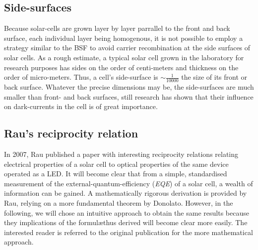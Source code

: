 \subsection{Side-surfaces}
Because solar-cells are grown layer by layer parrallel to the front and back surface, each individual layer being homogenous, it is not possible to employ a strategy similar to the BSF to avoid carrier recombination at the side surfaces of solar cells.
As a rough estimate, a typical \gaas solar cell grown in the laboratory for research purposes has sides on the order of centi-meters and thickness on the order of micro-meters. Thus, a cell's side-surface is $\sim \frac{1}{10000}$ the size of its front or back surface. Whatever the precise dimensions may be, the side-surfaces are much smaller than front- and back surfaces, still research has shown that their influence on dark-currents in the cell is of great importance.


\subsection{Rau's reciprocity relation}
In 2007, Rau published a paper with interesting reciprocity relations relating electrical properties of a solar cell to optical properties of the same device operated as a LED. It will become clear that from a simple, standardised measurement of the external-quantum-efficiency (\emph{EQE}) of a solar cell, a wealth of information can be gained. A mathematically rigorous derivation is provided by Rau, relying on a more fundamental theorem by Donolato. However, in the following, we will chose an intuitive approach to obtain the same results because they implications of the formul\ae thus derived will become clear more easily. The interested reader is referred to the original publication for the more mathematical approach.\\

